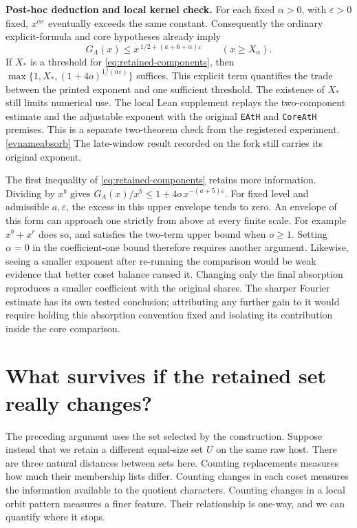 \documentclass[11pt,letterpaper]{article}
\newcommand{\evref}[1]{\hyperlink{ev-#1}{\textsf{\small[\csname evname#1\endcsname]}}}
\begin{document}
\textbf{Post-hoc deduction and local kernel check.}
For each fixed \(\alpha>0\), with \(\varepsilon>0\) fixed, \(x^{\alpha\varepsilon}\) eventually exceeds the same constant. Consequently the ordinary explicit-formula and core hypotheses already imply
\[
 G_\Lambda(x)\leq x^{\,1/2+(a+6+\alpha)\varepsilon}
 \qquad (x\geq X_\alpha).
\]
If \(X_*\) is a threshold for \eqref{eq:retained-components}, then
\(\max\{1,X_*,(1+4o)^{1/(\alpha\varepsilon)}\}\) suffices. This explicit term quantifies the trade between the printed exponent and one sufficient threshold. The existence of \(X_*\) still limits numerical use. The local Lean supplement replays the two-component estimate and the adjustable exponent with the original \texttt{EAtH} and \texttt{CoreAtH} premises. This is a separate two-theorem check from the registered experiment. \evref{absorb} The late-window result recorded on the fork still carries its original exponent.

The first inequality of \eqref{eq:retained-components} retains more information. Dividing by \(x^b\) gives \(G_\Lambda(x)/x^b\leq1+4o\,x^{-(a+5)\varepsilon}\). For fixed level and admissible \(a,\varepsilon\), the excess in this upper envelope tends to zero. An envelope of this form can approach one strictly from above at every finite scale. For example \(x^b+x^r\) does so, and satisfies the two-term upper bound when \(o\geq1\). Setting \(\alpha=0\) in the coefficient-one bound therefore requires another argument. Likewise, seeing a smaller exponent after re-running the comparison would be weak evidence that better coset balance caused it. Changing only the final absorption reproduces a smaller coefficient with the original shares. The sharper Fourier estimate has its own tested conclusion; attributing any further gain to it would require holding this absorption convention fixed and isolating its contribution inside the core comparison.

\section{What survives if the retained set really changes?}
\label{sec:margin}

The preceding argument uses the set selected by the construction. Suppose instead that we retain a different equal-size set \(U\) on the same raw host. There are three natural distances between sets here. Counting replacements measures how much their membership lists differ. Counting changes in each coset measures the information available to the quotient characters. Counting changes in a local orbit pattern measures a finer feature. Their relationship is one-way, and we can quantify where it stops.
\end{document}

